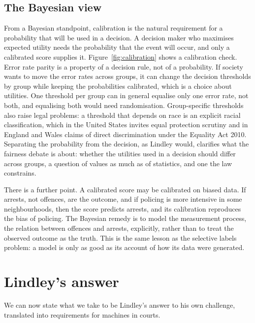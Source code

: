 \subsection{The Bayesian view}

From a Bayesian standpoint, calibration is the natural requirement for a probability that will be used in a decision. A decision maker who maximises expected utility needs the probability that the event will occur, and only a calibrated score supplies it. Figure~\ref{fig:calibration} shows a calibration check. Error rate parity is a property of a decision rule, not of a probability. If society wants to move the error rates across groups, it can change the decision thresholds by group while keeping the probabilities calibrated, which is a choice about utilities. One threshold per group can in general equalise only one error rate, not both, and equalising both would need randomisation. Group-specific thresholds also raise legal problems: a threshold that depends on race is an explicit racial classification, which in the United States invites equal protection scrutiny and in England and Wales claims of direct discrimination under the Equality Act 2010. Separating the probability from the decision, as Lindley would, clarifies what the fairness debate is about: whether the utilities used in a decision should differ across groups, a question of values as much as of statistics, and one the law constrains.

There is a further point. A calibrated score may be calibrated on biased data. If arrests, not offences, are the outcome, and if policing is more intensive in some neighbourhoods, then the score predicts arrests, and its calibration reproduces the bias of policing. The Bayesian remedy is to model the measurement process, the relation between offences and arrests, explicitly, rather than to treat the observed outcome as the truth. This is the same lesson as the selective labels problem: a model is only as good as its account of how its data were generated.

\section{Lindley's answer}

We can now state what we take to be Lindley's answer to his own challenge, translated into requirements for machines in courts.

